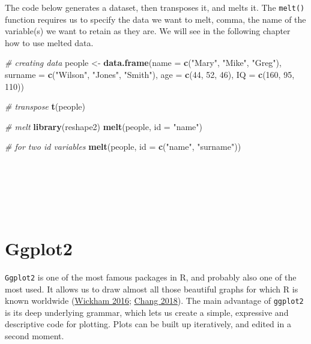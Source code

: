 \documentclass[
]{svmono}
\newenvironment{Shaded}{\begin{snugshade}}{\end{snugshade}}
\newcommand{\AttributeTok}[1]{\textcolor[rgb]{0.13,0.29,0.53}{#1}}
\newcommand{\CommentTok}[1]{\textcolor[rgb]{0.56,0.35,0.01}{\textit{#1}}}
\newcommand{\DecValTok}[1]{\textcolor[rgb]{0.00,0.00,0.81}{#1}}
\newcommand{\FunctionTok}[1]{\textcolor[rgb]{0.13,0.29,0.53}{\textbf{#1}}}
\newcommand{\NormalTok}[1]{#1}
\newcommand{\OtherTok}[1]{\textcolor[rgb]{0.56,0.35,0.01}{#1}}
\newcommand{\StringTok}[1]{\textcolor[rgb]{0.31,0.60,0.02}{#1}}
\begin{document}
The code below generates a dataset, then transposes it, and melts it.
The \texttt{melt()} function requires us to specify the data we want to melt,
comma, the name of the variable(s) we want to retain as they are. We
will see in the following chapter how to use melted data.

\begin{Shaded}
\begin{Highlighting}[]
\CommentTok{\# creating data}
\NormalTok{people }\OtherTok{\textless{}{-}} \FunctionTok{data.frame}\NormalTok{(}\AttributeTok{name =} \FunctionTok{c}\NormalTok{(}\StringTok{"Mary"}\NormalTok{, }\StringTok{"Mike"}\NormalTok{, }\StringTok{"Greg"}\NormalTok{),}
                     \AttributeTok{surname =} \FunctionTok{c}\NormalTok{(}\StringTok{"Wilson"}\NormalTok{, }\StringTok{"Jones"}\NormalTok{, }\StringTok{"Smith"}\NormalTok{),}
                     \AttributeTok{age =} \FunctionTok{c}\NormalTok{(}\DecValTok{44}\NormalTok{, }\DecValTok{52}\NormalTok{, }\DecValTok{46}\NormalTok{),}
                     \AttributeTok{IQ =} \FunctionTok{c}\NormalTok{(}\DecValTok{160}\NormalTok{, }\DecValTok{95}\NormalTok{, }\DecValTok{110}\NormalTok{))}

\CommentTok{\# transpose}
\FunctionTok{t}\NormalTok{(people)}

\CommentTok{\# melt}
\FunctionTok{library}\NormalTok{(reshape2)}
\FunctionTok{melt}\NormalTok{(people, }\AttributeTok{id =} \StringTok{"name"}\NormalTok{)}

\CommentTok{\# for two id variables}
\FunctionTok{melt}\NormalTok{(people, }\AttributeTok{id =} \FunctionTok{c}\NormalTok{(}\StringTok{"name"}\NormalTok{, }\StringTok{"surname"}\NormalTok{))}
\end{Highlighting}
\end{Shaded}

~

~

~

\hypertarget{ggplot2}{%
\section{Ggplot2}\label{ggplot2}}

\texttt{Ggplot2} is one of the most famous packages in R, and probably also one
of the most used. It allows us to draw almost all those beautiful graphs
for which R is known worldwide (\protect\hyperlink{ref-wickham2016}{Wickham 2016}; \protect\hyperlink{ref-chang2018}{Chang 2018}). The main
advantage of \texttt{ggplot2} is its deep underlying grammar, which lets us
create a simple, expressive and descriptive code for plotting. Plots can
be built up iteratively, and edited in a second moment.
\end{document}
